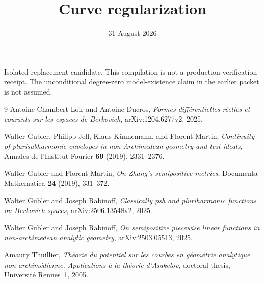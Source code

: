 \documentclass[11pt]{article}
\title{Curve regularization}
\author{}
\date{31 August 2026}
\begin{document}
\maketitle
\noindent
Isolated replacement candidate.  This compilation is not a production
verification receipt.  The unconditional degree-zero model-existence
claim in the earlier packet is not assumed.




\begin{thebibliography}{9}
Antoine Chambert-Loir and Antoine Ducros,
\emph{Formes diff\'erentielles r\'eelles et courants sur les espaces de
Berkovich}, arXiv:1204.6277v2, 2025.

Walter Gubler, Philipp Jell, Klaus K\"unnemann, and Florent Martin,
\emph{Continuity of plurisubharmonic envelopes in non-Archimedean geometry
and test ideals}, Annales de l'Institut Fourier \textbf{69} (2019),
2331--2376.

Walter Gubler and Florent Martin,
\emph{On Zhang's semipositive metrics},
Documenta Mathematica \textbf{24} (2019), 331--372.

Walter Gubler and Joseph Rabinoff,
\emph{Classically psh and pluriharmonic functions on Berkovich spaces},
arXiv:2506.13548v2, 2025.

Walter Gubler and Joseph Rabinoff,
\emph{On semipositive piecewise linear functions in non-archimedean
analytic geometry}, arXiv:2503.05513, 2025.

Amaury Thuillier,
\emph{Th\'eorie du potentiel sur les courbes en g\'eom\'etrie analytique
non archim\'edienne. Applications \`a la th\'eorie d'Arakelov},
doctoral thesis, Universit\'e Rennes~1, 2005.
\end{thebibliography}
\end{document}

